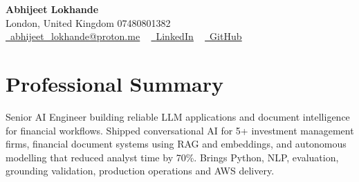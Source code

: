 \documentclass[a4paper,10pt]{article}
\begin{document}
    \begin{center}
        {\Huge\bfseries Abhijeet Lokhande}
        \\[2pt] {\color{muted}London, United Kingdom \textbar{} 07480801382}\\
        \small
        \href{mailto:abhijeet_lokhande@proton.me}{\raisebox{-0.2\height}{\color{primary}\faEnvelope}\  \underline{abhijeet\_lokhande@proton.me}} ~
        \href{https://www.linkedin.com/in/ablds/}{\raisebox{-0.2\height}{\color{primary}\faLinkedin}\ \underline{LinkedIn}}  ~
        \href{https://github.com/abhijeetscode}{\raisebox{-0.2\height}{\color{primary}\faGithub}\ \underline{GitHub}}
    \end{center}

\section{Professional Summary}
\vspace{-5pt}
{\color{muted}Senior AI Engineer building reliable LLM applications and document intelligence for financial workflows. Shipped conversational AI for 5+ investment management firms, financial document systems using RAG and embeddings, and autonomous modelling that reduced analyst time by 70\%. Brings Python, NLP, evaluation, grounding validation, production operations and AWS delivery.}
\vspace{2pt}

\end{document}
